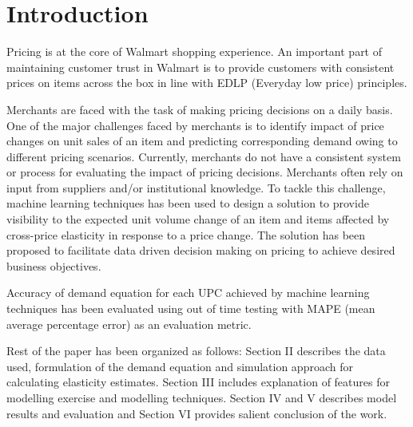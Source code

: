 \section{Introduction}
Pricing is at the core of Walmart shopping experience. An important part of maintaining customer trust in Walmart is to 
provide customers with consistent prices on items across the box in line with EDLP (Everyday low price) principles.

Merchants are faced with the task of making pricing decisions on a daily basis. One of the major challenges 
faced by merchants is to identify impact of price changes on unit sales of an item and predicting corresponding 
demand owing to different pricing scenarios. Currently, merchants do not have a consistent system or process for 
evaluating the impact of pricing decisions. Merchants often rely on input from suppliers and/or institutional knowledge. 
To tackle this challenge, machine learning techniques has been used to design a solution to provide visibility to 
the expected unit volume change of an item and items affected by cross-price elasticity in response to a price change. 
The solution has been proposed to facilitate data driven decision making on pricing to achieve desired business objectives.

Accuracy of demand equation for each UPC achieved by machine learning techniques has been evaluated using out of 
time testing with MAPE (mean average percentage error) as an evaluation metric.

Rest of the paper has been organized as follows: Section II describes the data used, formulation of the demand 
equation and simulation approach for calculating elasticity estimates. Section III includes explanation of features 
for modelling exercise and modelling techniques. Section IV and V describes model results and evaluation and Section VI 
provides salient conclusion of the work.
